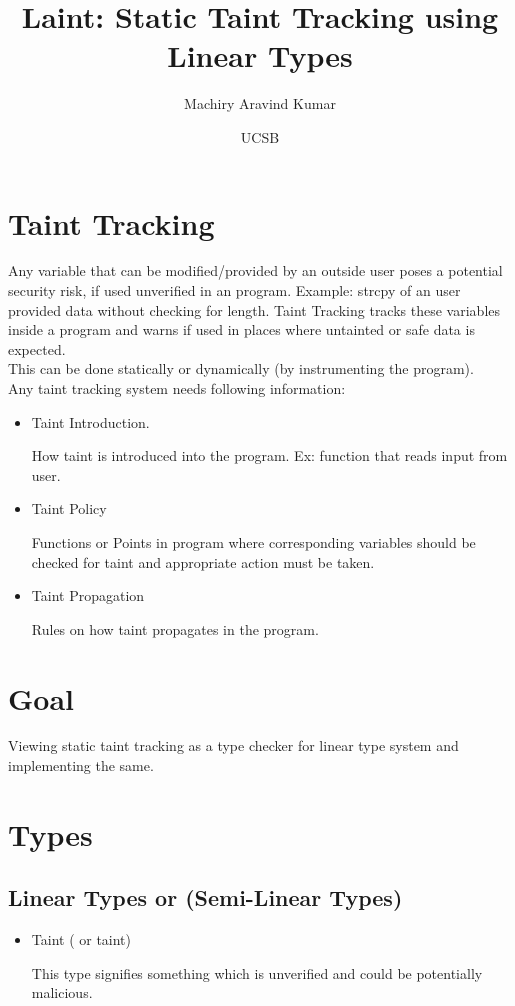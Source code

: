 \documentclass[11pt, pdftex]{article}
\title{Laint: Static Taint Tracking using Linear Types}
\author{Machiry Aravind Kumar}
\date{UCSB}
\begin{document}
\maketitle
\section{Taint Tracking}
Any variable that can be modified/provided by an outside user poses a potential security risk, if used unverified in an program. Example: strcpy of an user provided data without checking for length. Taint Tracking tracks these variables inside a program and warns if used in places where untainted or safe data is expected. \\
This can be done statically or dynamically (by instrumenting the program).\\
Any taint tracking system needs following information:
\begin{itemize}
\item Taint Introduction.
\begin{description}
How taint is introduced into the program. Ex: function that reads input from user.
\end{description}
\item Taint Policy
\begin{description}
Functions or Points in program where corresponding variables should be checked for taint and appropriate action must be taken.
\end{description}
\item {Taint Propagation}
\begin{description}
Rules on how taint propagates in the program.
\end{description}
\end{itemize}
\section{Goal}
Viewing static taint tracking as a type checker for linear type system and implementing the same.
\section{Types}
\subsection{Linear Types or (Semi-Linear Types)}
\begin{itemize}
\item Taint ( or taint)
\begin{description}
This type signifies something which is unverified and could be potentially malicious.
\end{description}
\end{itemize}
\end{document}
